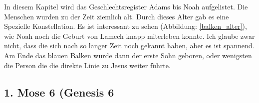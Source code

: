 In diesem Kapitel wird das Geschlechtsregister Adams bis Noah aufgelistet. Die Menschen wurden zu der Zeit ziemlich alt. Durch dieses Alter gab es eine Spezielle Konstellation.
Es ist interessant zu sehen (Abbildung: \ref{balken_alter}), wie Noah noch die Geburt von Lamech knapp miterleben konnte. Ich glaube zwar nicht, dass die sich nach so langer Zeit noch gekannt haben, aber es ist spannend. Am Ende das blauen Balken wurde dann der erste Sohn geboren, oder wenigsten die Person die die direkte Linie zu Jesus weiter führte. 

\subsection{1. Mose 6 (Genesis 6}


